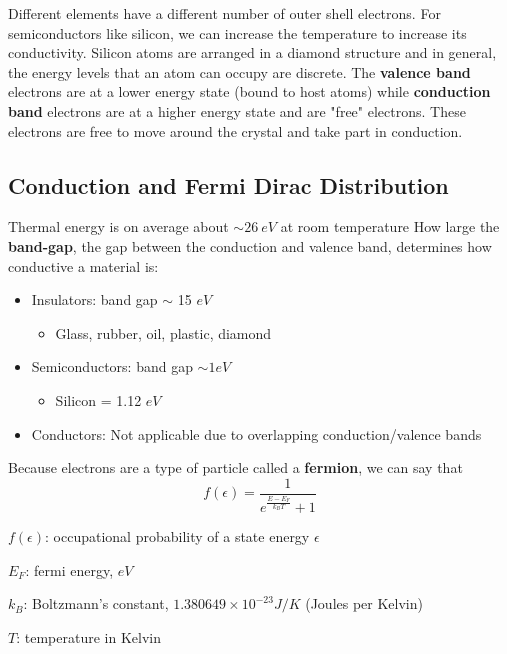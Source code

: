 Different elements have a different number of outer shell electrons. For semiconductors like silicon, we can increase the temperature to increase its conductivity. Silicon atoms are arranged in a diamond structure and in general, the energy levels that an atom can occupy are discrete. The \textbf{valence band} electrons are at a lower energy state (bound to host atoms) while \textbf{conduction band} electrons are at a higher energy state and are "free" electrons. These electrons are free to move around the crystal and take part in conduction. 

\subsection{Conduction and Fermi Dirac Distribution}
Thermal energy is on average about $\sim 26~eV$ at room temperature How large the \textbf{band-gap}, the gap between the conduction and valence band, determines how conductive a material is:
\begin{itemize}
    \item Insulators: band gap $\sim$ 15 $eV$
    \begin{itemize}
        \item Glass, rubber, oil, plastic, diamond
    \end{itemize}
    \item Semiconductors: band gap $\sim 1 eV$
    \begin{itemize}
        \item Silicon = 1.12 $eV$
    \end{itemize}
    \item Conductors: Not applicable due to overlapping conduction/valence bands
\end{itemize}
Because electrons are a type of particle called a \textbf{fermion}, we can say that 
\[f(\epsilon) = \frac{1}{e^{\frac{E - E_F}{k_B T}} + 1}\]
\begin{gline}
    \item $f(\epsilon)$: occupational probability of a state energy $\epsilon$
    \item $E_F$: fermi energy, $eV$
    \item $k_B$: Boltzmann's constant, $1.380649 \times 10^{-23} J/K$ (Joules per Kelvin)
    \item $T$: temperature in Kelvin
\end{gline}
